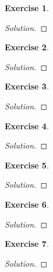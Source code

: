 \documentclass[12pt,a4]{article}
\theoremstyle{definition}
\newtheorem{exercise}{Exercise}
\begin{document}
\begin{exercise}
	
\end{exercise}
\begin{proof}[Solution]
	
\end{proof}

\begin{exercise}
	
\end{exercise}
\begin{proof}[Solution]
	
\end{proof}

\begin{exercise}
	
\end{exercise}
\begin{proof}[Solution]
	
\end{proof}

\begin{exercise}
	
\end{exercise}
\begin{proof}[Solution]
	
\end{proof}

\begin{exercise}
	
\end{exercise}
\begin{proof}[Solution]
	
\end{proof}

\begin{exercise}
	
\end{exercise}
\begin{proof}[Solution]
	
\end{proof}

\begin{exercise}
	
\end{exercise}
\begin{proof}[Solution]
	
\end{proof}
\end{document}
